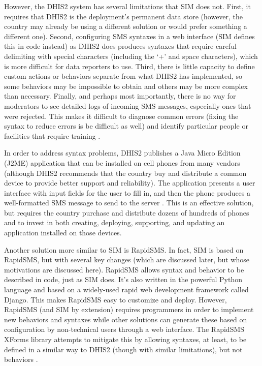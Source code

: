 \documentclass{acm_proc_article-sp}
\begin{document}
However, the DHIS2 system has several limitations that SIM does not. First, it requires that DHIS2 is the deployment's permanent data store (however, the country may already be using a different solution or would prefer something a different one). Second, configuring SMS syntaxes in a web interface (SIM defines this in code instead) as DHIS2 does produces syntaxes that require careful delimiting with special characters (including the `+' and space characters), which is more difficult for data reporters to use. Third, there is little capacity to define custom actions or behaviors separate from what DHIS2 has implemented, so some behaviors may be impossible to obtain and others may be more complex than necessary. Finally, and perhaps most importantly, there is no way for moderators to see detailed logs of incoming SMS messages, especially ones that were rejected. This makes it difficult to diagnose common errors (fixing the syntax to reduce errors is be difficult as well) and identify particular people or facilities that require training \cite{dhis2:smsref, dhis2:smsoverview}.

In order to address syntax problems, DHIS2 publishes a Java Micro Edition (J2ME) application that can be installed on cell phones from many vendors (although DHIS2 recommends that the country buy and distribute a common device to provide better support and reliability). The application presents a user interface with input fields for the user to fill in, and then the phone produces a well-formatted SMS message to send to the server \cite{dhis2:smsoverview, dhis2:j2me}. This is an effective solution, but requires the country purchase and distribute dozens of hundreds of phones and to invest in both creating, deploying, supporting, and updating an application installed on those devices.

Another solution more similar to SIM is RapidSMS. In fact, SIM is based on RapidSMS, but with several key changes (which are discussed later, but whose motivations are discussed here). RapidSMS allows syntax and behavior to be described in code, just as SIM does. It's also written in the powerful Python language and based on a widely-used rapid web development framework called Django. This makes RapidSMS easy to customize and deploy. However, RapidSMS (and SIM by extension) requires programmers in order to implement new behaviors and syntaxes while other solutions can generate these based on configuration by non-technical users through a web interface. The RapidSMS XForms library attempts to mitigate this by allowing syntaxes, at least, to be defined in a similar way to DHIS2 (though with similar limitations), but not behaviors \cite{rapidsms:overview, rapidsms:xforms}.
\end{document}
